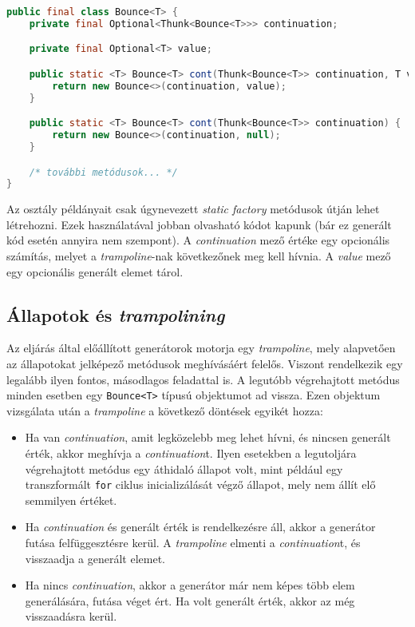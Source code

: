 \begin{lstlisting}[language=Java, caption={A \texttt{Bounce<T>} osztály legfontosabb mezői és metódusai}, captionpos=b, label=JavaBounce, escapechar=$]
public final class Bounce<T> {
    private final Optional<Thunk<Bounce<T>>> continuation;

    private final Optional<T> value;

    public static <T> Bounce<T> cont(Thunk<Bounce<T>> continuation, T value) {
        return new Bounce<>(continuation, value);
    }

    public static <T> Bounce<T> cont(Thunk<Bounce<T>> continuation) {
        return new Bounce<>(continuation, null);
    }

    /* további metódusok... */
}
\end{lstlisting}    

Az osztály példányait csak úgynevezett \textit{static factory} metódusok útján lehet létrehozni. Ezek használatával jobban olvasható kódot kapunk (bár ez generált kód esetén annyira nem szempont). A \textit{continuation} mező értéke egy opcionális számítás, melyet a \textit{trampoline}-nak következőnek meg kell hívnia. A \textit{value} mező egy opcionális generált elemet tárol. 

\subsection{Állapotok és \textit{trampolining}}

Az eljárás által előállított generátorok motorja egy \textit{trampoline}, mely alapvetően az állapotokat jelképező metódusok meghívásáért felelős. Viszont rendelkezik egy legalább ilyen fontos, másodlagos feladattal is. A legutóbb végrehajtott metódus minden esetben egy \texttt{Bounce<T>} típusú objektumot ad vissza. Ezen objektum vizsgálata után a \textit{trampoline} a következő döntések egyikét hozza:

\begin{itemize}
    \item Ha van \textit{continuation}, amit legközelebb meg lehet hívni, és nincsen generált érték, akkor meghívja a \textit{continuation}t. Ilyen esetekben a legutoljára végrehajtott metódus egy áthidaló állapot volt, mint például egy transzformált \texttt{for} ciklus inicializálását végző állapot, mely nem állít elő semmilyen értéket.
    \item Ha \textit{continuation} és generált érték is rendelkezésre áll, akkor a generátor futása felfüggesztésre kerül. A \textit{trampoline} elmenti a \textit{continuation}t, és visszaadja a generált elemet.
    \item Ha nincs \textit{continuation}, akkor a generátor már nem képes több elem generálására, futása véget ért. Ha volt generált érték, akkor az még visszaadásra kerül.
\end{itemize}

